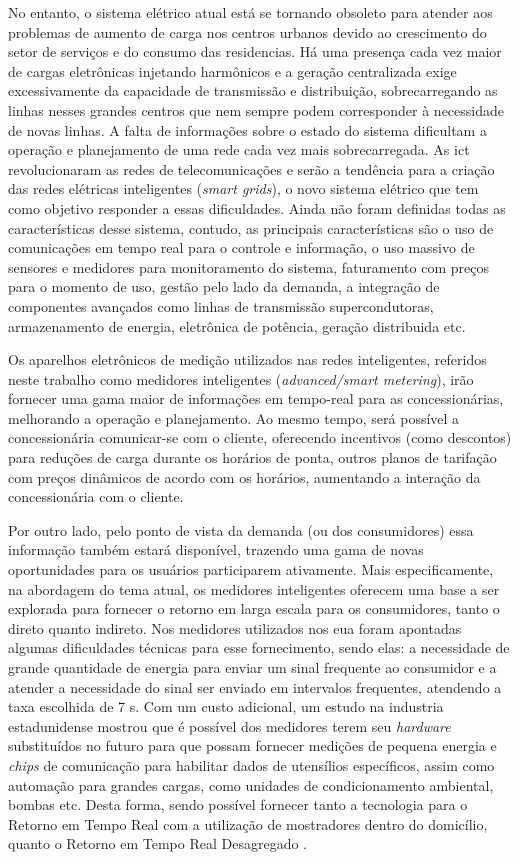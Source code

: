 No entanto, o sistema elétrico atual está se tornando obsoleto para atender aos problemas de 
aumento de carga nos centros urbanos devido ao crescimento do setor 
de serviços e do consumo das residencias. Há uma presença cada vez maior
de cargas eletrônicas injetando harmônicos e a geração centralizada exige 
excessivamente da capacidade de transmissão e distribuição, 
sobrecarregando as linhas nesses grandes centros que nem sempre podem 
corresponder à necessidade de novas linhas. A falta de informações sobre o 
estado do sistema dificultam a operação e planejamento de uma rede cada vez mais 
sobrecarregada. As \gls{ict} revolucionaram as redes de telecomunicações e 
serão a tendência para a criação das redes elétricas inteligentes (\emph{smart 
grids}), o novo sistema elétrico que tem como objetivo responder a essas
dificuldades. Ainda não foram definidas todas as características desse sistema,
contudo, as principais características são o uso de comunicações em tempo real
para o controle e informação, o uso massivo de sensores e medidores para
monitoramento do sistema, faturamento com preços para o momento de uso, 
gestão pelo lado da demanda, a integração de 
componentes avançados como linhas de transmissão supercondutoras,
armazenamento de energia, eletrônica de potência, geração distribuida
etc.  \cite{dissert_caires,aceee_2010_estudos_feedback}

Os aparelhos eletrônicos de medição utilizados nas redes inteligentes, referidos
neste trabalho como medidores inteligentes (\emph{advanced/smart metering}), irão 
fornecer uma gama maior de informações em tempo-real para as concessionárias,
melhorando a operação e planejamento. Ao mesmo tempo, será possível a
concessionária comunicar-se com o cliente, oferecendo incentivos (como
descontos) para reduções de carga durante os horários de ponta, 
outros planos de tarifação com preços dinâmicos de acordo com os horários,
aumentando a interação da concessionária com o cliente. 

Por outro lado, pelo ponto de vista da demanda (ou dos consumidores) essa 
informação também estará disponível, trazendo uma gama de novas oportunidades 
para os usuários participarem ativamente. Mais especificamente, na abordagem do
tema atual, os medidores inteligentes oferecem uma base
a ser explorada para fornecer o retorno em larga escala para os consumidores, 
tanto o direto quanto indireto. Nos medidores utilizados nos \gls{eua}
foram apontadas algumas dificuldades técnicas para esse fornecimento,
sendo elas: a necessidade de grande quantidade de energia para enviar
um sinal frequente ao consumidor e a
atender a necessidade do sinal ser enviado em intervalos frequentes,
atendendo a taxa escolhida de 7 s. Com um custo adicional, um estudo
na industria estadunidense mostrou que
é possível dos medidores terem seu \emph{hardware} substituídos 
no futuro para que possam fornecer medições de pequena energia e \emph{chips} 
de comunicação para habilitar dados de utensílios específicos, assim como 
automação para grandes cargas, como unidades de condicionamento ambiental, 
bombas etc. Desta forma, sendo possível 
fornecer tanto a tecnologia para o Retorno em Tempo Real com a utilização de 
mostradores dentro do domicílio, quanto o Retorno em Tempo Real Desagregado
\cite{aceee_2010_estudos_feedback}.

